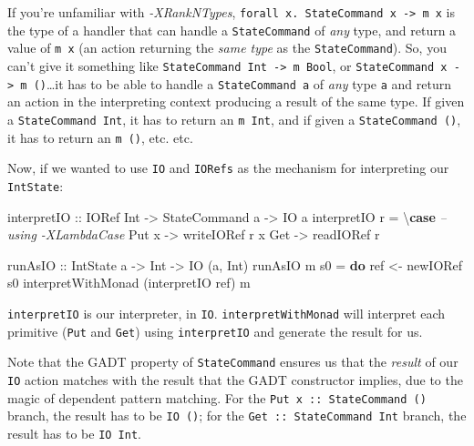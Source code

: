 \documentclass[]{article}
\newenvironment{Shaded}{}{}
\newcommand{\CommentTok}[1]{\textcolor[rgb]{0.38,0.63,0.69}{\textit{#1}}}
\newcommand{\DataTypeTok}[1]{\textcolor[rgb]{0.56,0.13,0.00}{#1}}
\newcommand{\FunctionTok}[1]{\textcolor[rgb]{0.02,0.16,0.49}{#1}}
\newcommand{\KeywordTok}[1]{\textcolor[rgb]{0.00,0.44,0.13}{\textbf{#1}}}
\newcommand{\NormalTok}[1]{#1}
\newcommand{\OtherTok}[1]{\textcolor[rgb]{0.00,0.44,0.13}{#1}}
\begin{document}
If you're unfamiliar with \emph{-XRankNTypes},
\texttt{forall\ x.\ StateCommand\ x\ -\textgreater{}\ m\ x} is the type of a
handler that can handle a \texttt{StateCommand} of \emph{any} type, and return a
value of \texttt{m\ x} (an action returning the \emph{same type} as the
\texttt{StateCommand}). So, you can't give it something like
\texttt{StateCommand\ Int\ -\textgreater{}\ m\ Bool}, or
\texttt{StateCommand\ x\ -\textgreater{}\ m\ ()}\ldots{}it has to be able to
handle a \texttt{StateCommand\ a} of \emph{any} type \texttt{a} and return an
action in the interpreting context producing a result of the same type. If given
a \texttt{StateCommand\ Int}, it has to return an \texttt{m\ Int}, and if given
a \texttt{StateCommand\ ()}, it has to return an \texttt{m\ ()}, etc. etc.

Now, if we wanted to use \texttt{IO} and \texttt{IORefs} as the mechanism for
interpreting our \texttt{IntState}:

\begin{Shaded}
\begin{Highlighting}[]
\NormalTok{interpretIO}
\OtherTok{    ::} \DataTypeTok{IORef} \DataTypeTok{Int}
    \OtherTok{->} \DataTypeTok{StateCommand}\NormalTok{ a}
    \OtherTok{->} \DataTypeTok{IO}\NormalTok{ a}
\NormalTok{interpretIO r }\FunctionTok{=}\NormalTok{ \textbackslash{}}\KeywordTok{case}           \CommentTok{-- using -XLambdaCase}
    \DataTypeTok{Put}\NormalTok{ x }\OtherTok{->}\NormalTok{ writeIORef r x}
    \DataTypeTok{Get}   \OtherTok{->}\NormalTok{ readIORef r}

\OtherTok{runAsIO ::} \DataTypeTok{IntState}\NormalTok{ a }\OtherTok{->} \DataTypeTok{Int} \OtherTok{->} \DataTypeTok{IO}\NormalTok{ (a, }\DataTypeTok{Int}\NormalTok{)}
\NormalTok{runAsIO m s0 }\FunctionTok{=} \KeywordTok{do}
\NormalTok{    ref }\OtherTok{<-}\NormalTok{ newIORef s0}
\NormalTok{    interpretWithMonad (interpretIO ref) m}
\end{Highlighting}
\end{Shaded}

\texttt{interpretIO} is our interpreter, in \texttt{IO}.
\texttt{interpretWithMonad} will interpret each primitive (\texttt{Put} and
\texttt{Get}) using \texttt{interpretIO} and generate the result for us.

Note that the GADT property of \texttt{StateCommand} ensures us that the
\emph{result} of our \texttt{IO} action matches with the result that the GADT
constructor implies, due to the magic of dependent pattern matching. For the
\texttt{Put\ x\ ::\ StateCommand\ ()} branch, the result has to be
\texttt{IO\ ()}; for the \texttt{Get\ ::\ StateCommand\ Int} branch, the result
has to be \texttt{IO\ Int}.
\end{document}
